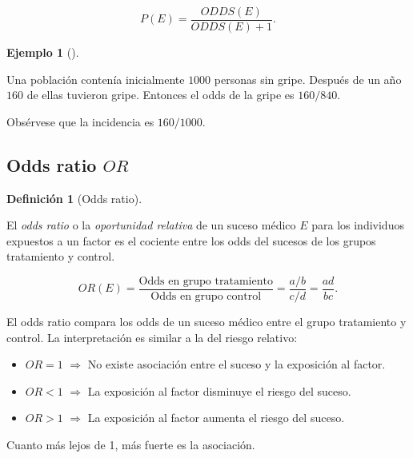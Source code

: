 \documentclass[
  spanish,
  a4paper,
]{scrreport}
\providecommand{\tightlist}{%
  \setlength{\itemsep}{0pt}\setlength{\parskip}{0pt}}
\theoremstyle{plain}
\theoremstyle{definition}
\newtheorem{example}{Ejemplo}[chapter]
\theoremstyle{definition}
\newtheorem{definition}{Definición}[chapter]
\theoremstyle{remark}
\begin{document}
\[P(E) = \frac{ODDS(E)}{ODDS(E)+1}.\]

\begin{example}[]\protect\hypertarget{exm-odds}{}\label{exm-odds}

Una población contenía inicialmente \(1000\) personas sin gripe. Después
de un año \(160\) de ellas tuvieron gripe. Entonces el odds de la gripe
es \(160/840\).

Obsérvese que la incidencia es \(160/1000\).

\end{example}

\subsection{\texorpdfstring{Odds ratio
\(OR\)}{Odds ratio OR}}\label{odds-ratio-or}

\begin{definition}[Odds
ratio]\protect\hypertarget{def-odds-ratio}{}\label{def-odds-ratio}

El \emph{odds ratio} o la \emph{oportunidad relativa} de un suceso
médico \(E\) para los individuos expuestos a un factor es el cociente
entre los odds del sucesos de los grupos tratamiento y control.

\[OR(E)=\frac{\mbox{Odds en grupo tratamiento}}{\mbox{Odds en grupo control}}=\frac{a/b}{c/d}=\frac{ad}{bc}.\]

\end{definition}

\begin{tcolorbox}[enhanced jigsaw, arc=.35mm, bottomrule=.15mm, bottomtitle=1mm, breakable, colback=white, colbacktitle=quarto-callout-note-color!10!white, colframe=quarto-callout-note-color-frame, coltitle=black, left=2mm, leftrule=.75mm, opacityback=0, opacitybacktitle=0.6, rightrule=.15mm, title=\textcolor{quarto-callout-note-color}{\faInfo}\hspace{0.5em}{Interpretación}, titlerule=0mm, toprule=.15mm, toptitle=1mm]

El odds ratio compara los odds de un suceso médico entre el grupo
tratamiento y control. La interpretación es similar a la del riesgo
relativo:

\begin{itemize}
\tightlist
\item
  \(OR=1\) \(\Rightarrow\) No existe asociación entre el suceso y la
  exposición al factor.
\item
  \(OR<1\) \(\Rightarrow\) La exposición al factor disminuye el riesgo
  del suceso.
\item
  \(OR>1\) \(\Rightarrow\) La exposición al factor aumenta el riesgo del
  suceso.
\end{itemize}

Cuanto más lejos de 1, más fuerte es la asociación.

\end{tcolorbox}
\end{document}
